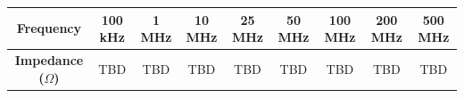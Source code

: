 \documentclass[10pt,a4paper]{article}
\begin{document}
{\footnotesize
\begin{center}
\begin{tabular}{|c|c|c|c|c|c|c|c|c|}
\hline
\rowcolor{tableheader}
\textbf{Frequency} & 100 kHz & 1 MHz & 10 MHz & 25 MHz & 50 MHz & 100 MHz & 200 MHz & 500 MHz \\
\hline
\textbf{Impedance ($\Omega$)} & TBD & TBD & TBD & TBD & TBD & TBD & TBD & TBD \\
\hline
\end{tabular}
\end{center}
}

\vspace{4mm}

\noindent{\normalsize\bfseries\textcolor{wurthred}{Performance Characteristics}}
\vspace{2mm}

\begin{center}
\begin{minipage}{0.48\textwidth}
\centering
{}
\end{minipage}
\hfill
\begin{minipage}{0.48\textwidth}
\centering
{}
\end{minipage}
\end{center}

\vspace{4mm}
\end{document}
